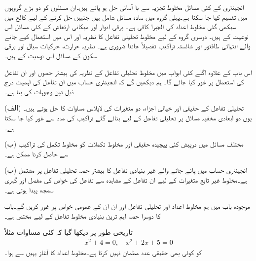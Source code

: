 انجینئری کے کئی مسائل مخلوط تجزیہ سے با آسانی حل ہو پاتے ہیں۔ان مسئلوں کو دو بڑے گروہوں میں تقسیم کیا جا سکتا ہے۔پہلی گروہ میں سادہ مسائل شامل ہیں جنہیں حل کرنے کے لیے کالج میں سیکھی گئی مخلوط اعداد کی الجبرا کافی ہے۔ برقی ادوار اور میکانی ارتعاش  کے کئی مسائل اس نوعیت کے ہیں۔ دوسری گروہ کے لیے مخلوط تحلیلی تفاعل کا نظریہ اور اس میں استعمال کیے جانے والے انتہائی طاقتور اور شائستہ تراکیب  تفصیلاً جاننا ضروری ہے۔ نظریہ حرارت، حرکیات سیال اور برقی سکون کے مسائل اس نوعیت کے ہیں۔

اس باب کے علاوہ اگلے کئی ابواب میں مخلوط تحلیلی تفاعل کے نظریہ کی بیشتر حصوں اور ان تفاعل کی استعمال  پر غور کیا جائے گا۔ ہم دیکھیں گے کہ انجینئری حساب میں ان تفاعل کی اہمیت درج ذیل تین وجوہات کی بنا ہے۔\\
\begin{description}
\item{(الف)}
تحلیلی تفاعل کے حقیقی اور خیالی اجزاء، دو متغیرات کی لاپلاس مساوات کا حل ہوتے ہیں۔ یوں دو ابعادی مخفیہ مسائل پر تحلیلی تفاعل کے لیے بنائے گئے تراکیب کی مدد سے غور کیا جا سکتا ہے۔
\item{(ب)}
مختلف مسائل میں درپیش کئی پیچیدہ حقیقی اور مخلوط تکملات کو مخلوط تکمل کی تراکیب سے حاصل کرنا ممکن ہے۔
\item{(پ)}
انجینئری حساب میں پائے جانے والے غیر بنیادی تفاعل کا بیشتر حصہ تحلیلی تفاعل پر مشتمل ہے۔مخلوط غیر تابع متغیرات کے لیے ان تفاعل کے مشاہدہ  سے تفاعل کی خواص کی مفصل اور گہری  سمجھ پیدا ہوتی ہے۔
\end{description}

موجودہ باب میں ہم مخلوط اعداد اور تحلیلی تفاعل اور ان ان کے عمومی خواص پر غور کریں گے۔باب کا دوسرا حصہ اہم ترین بنیادی مخلوط تفاعل کے لیے مختص ہے۔

تاریخی طور پر دیکھا گیا کہ کئی مساوات مثلاً 
\begin{align*}
x^2+4=0,\quad x^2+2x+5=0
\end{align*}
 کو کوئی بھی حقیقی عدد مطمئن نہیں کرتا ہے۔مخلوط اعداد کا آغاز یہیں سے ہوا۔


